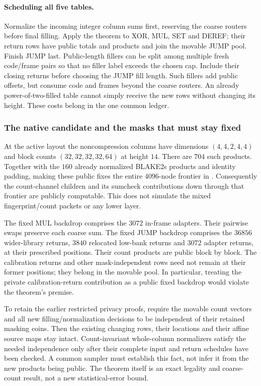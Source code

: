 \paragraph{Scheduling all five tables.} Normalize the incoming integer column sums first, reserving the coarse routers before final filling. Apply the theorem to XOR, MUL, SET and DEREF; their return rows have public totals and products and join the movable JUMP pool. Finish JUMP last. Public-length fillers can be split among multiple fresh code/frame pairs so that no filler label exceeds the chosen cap. Include their closing returns before choosing the JUMP fill length. Such fillers add public offsets, but consume code and frames beyond the coarse routers. An already power-of-two-filled table cannot simply receive the new rows without changing its height. These costs belong in the one common ledger.

\subsubsection{The native candidate and the masks that must stay fixed}

At the active layout the noncompression columns have dimensions $(4,4,2,4,4)$ and block counts $(32,32,32,32,64)$ at height $14$. There are $704$ such products. Together with the $160$ already normalized BLAKE2s products and identity padding, making these public fixes the entire $4096$-node frontier in . Consequently the count-channel children and its sumcheck contributions down through that frontier are publicly computable. This does not simulate the mixed fingerprint/count packets or any lower layer.

The fixed MUL backdrop comprises the $3072$ in-frame adapters. Their pairwise swaps preserve each coarse sum. The fixed JUMP backdrop comprises the $36856$ wider-library returns, $3840$ relocated low-bank returns and $3072$ adapter returns, at their prescribed positions. Their count products are public block by block. The calibration returns and other mask-independent rows need not remain at their former positions; they belong in the movable pool. In particular, treating the private calibration-return contribution as a public fixed backdrop would violate the theorem's premise.

To retain the earlier restricted privacy proofs, require the movable count vectors and all new filling/normalization decisions to be independent of their retained masking coins. Then the existing changing rows, their locations and their affine source maps stay intact. Count-invariant whole-column normalizers satisfy the needed independence only after their complete input and return schedules have been checked. A common sampler must establish this fact, not infer it from the new products being public. The theorem itself is an exact legality and coarse-count result, not a new statistical-error bound.

